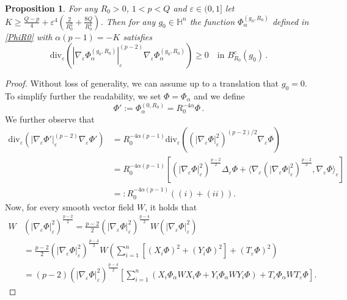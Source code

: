 \documentclass[10pt]{amsart}
\numberwithin{equation}{section}
\newtheorem{proposition}[theorem]{Proposition}
\theoremstyle{definition}
\newcommand{\eps}{\varepsilon}
\newcommand{\escal}[2]{\langle {#1},{#2}\rangle_{\eps}}
\newcommand{\egrad}{\nabla_{\eps}}
\newcommand{\eT}{T_{\eps}}
\begin{document}
\begin{proposition}\label{SubBarrier}
For any $R_0>0$, $1<p<Q$ and $\varepsilon \in (0,1]$ let $K\geq \frac{Q-p}4 + \varepsilon^4 \left(\frac{2}{R_0^2} +  \frac{8 Q}{R_0^4} \right) $. Then for any $g_0 \in \mathbb{H}^n$ the function $\Phi^{(g_0, R_0)}_{\alpha}$ defined in \eqref{PhiR0} with $\alpha (p-1) = -K$ satisfies
\begin{equation}\label{goal}
\mathrm{div}_{\eps}\left(  |\nabla_{\eps} \Phi^{(g_0, R_0)}_{\alpha}|_{\eps}^{(p-2)}\nabla_{\eps}\Phi^{(g_0, R_0)}_{\alpha} \right) \geq 0 \quad \textrm{in } B^{c}_{R_0}(g_0) \, .
\end{equation}
\end{proposition}
\begin{proof}
Without loss of generality, we can assume up to a translation that $g_0 = 0$. To simplify further the
readability, we set $\Phi=\Phi_{\alpha}$ and we define 
\begin{equation}\label{def:Phi'}
  \Phi':= \Phi^{(0, R_0)}_{\alpha} = R_{0}^{-4\alpha} \Phi \, .
  \end{equation}
We further observe that
\begin{equation}
\label{decpepslap}
\begin{aligned}
\mathrm{div}_{\eps}\left(  |\nabla_{\eps} \Phi'|_{\eps}^{(p-2)}\nabla_{\eps}\Phi' \right) &= R_{0}^{-4\alpha (p-1)} \mathrm{div}_{\eps}\left( \left( |\nabla_{\eps} \Phi|_{\eps}^{2}\right)^{(p-2)/2}\nabla_{\eps}\Phi \right) \\
&= R_{0}^{-4\alpha (p-1)} \left[\left(|\egrad \Phi|_\varepsilon^2 \right)^{\tfrac{p-2}{2}} \Delta_{\eps}\Phi + \escal{\egrad \left(|\egrad \Phi|_\varepsilon^{2} \right)^{\tfrac{p-2}{2}}}{\egrad \Phi}\right]\\
&=: R_{0}^{-4\alpha (p-1)} \left( (i) + (ii) \right).
\end{aligned}
\end{equation}
Now, for every smooth vector field $W$, it holds that
\begin{equation}
\label{Waction}
\begin{aligned} 
W &\left(|\egrad \Phi|_\varepsilon^2 \right)^{\tfrac{p-2}{2}} = \tfrac{p-2}{2} \left(|\egrad \Phi|_\varepsilon^2 \right)^{\tfrac{p-4}{2}} W (|\egrad \Phi|_\varepsilon^{2})\\
&= \tfrac{p-2}{2} \left(|\egrad \Phi|_\varepsilon^2 \right)^{\tfrac{p-4}{2}} W \left( \sum_{i=1}^{n}\left[(X_i \Phi)^2 + (Y_i \Phi)^2\right] + (\eT \Phi)^2 \right) \\
&= (p-2) \left(|\egrad \Phi|_\varepsilon^2 \right)^{\tfrac{p-4}{2}} \left[ \sum_{i=1}^{n} \left( X_i \Phi_\alpha WX_i \Phi + Y_i \Phi_\alpha WY_i \Phi \right) + \eT \Phi_\alpha W\eT \Phi \right].

\end{aligned}
\end{equation}
\end{proof}
\end{document}

